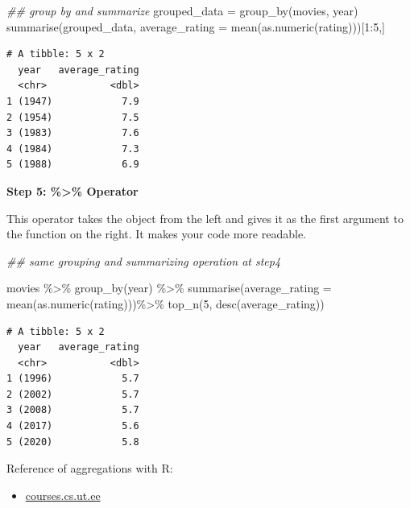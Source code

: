 \documentclass[
  letterpaper,
  DIV=11,
  numbers=noendperiod]{scrreprt}
\newenvironment{Shaded}{\begin{snugshade}}{\end{snugshade}}
\newcommand{\AttributeTok}[1]{\textcolor[rgb]{0.40,0.45,0.13}{#1}}
\newcommand{\DecValTok}[1]{\textcolor[rgb]{0.68,0.00,0.00}{#1}}
\newcommand{\DocumentationTok}[1]{\textcolor[rgb]{0.37,0.37,0.37}{\textit{#1}}}
\newcommand{\FunctionTok}[1]{\textcolor[rgb]{0.28,0.35,0.67}{#1}}
\newcommand{\NormalTok}[1]{\textcolor[rgb]{0.00,0.23,0.31}{#1}}
\newcommand{\OtherTok}[1]{\textcolor[rgb]{0.00,0.23,0.31}{#1}}
\newcommand{\SpecialCharTok}[1]{\textcolor[rgb]{0.37,0.37,0.37}{#1}}
\providecommand{\tightlist}{%
  \setlength{\itemsep}{0pt}\setlength{\parskip}{0pt}}\usepackage{longtable,booktabs,array}
\begin{document}
\begin{Shaded}
\begin{Highlighting}[]
\DocumentationTok{\#\# group by and summarize}
\NormalTok{grouped\_data }\OtherTok{=} \FunctionTok{group\_by}\NormalTok{(movies, year)}
\FunctionTok{summarise}\NormalTok{(grouped\_data, }\AttributeTok{average\_rating =} \FunctionTok{mean}\NormalTok{(}\FunctionTok{as.numeric}\NormalTok{(rating)))[}\DecValTok{1}\SpecialCharTok{:}\DecValTok{5}\NormalTok{,]}
\end{Highlighting}
\end{Shaded}

\begin{verbatim}
# A tibble: 5 x 2
  year   average_rating
  <chr>           <dbl>
1 (1947)            7.9
2 (1954)            7.5
3 (1983)            7.6
4 (1984)            7.3
5 (1988)            6.9
\end{verbatim}

\textbf{Step 5: \%\textgreater\% Operator}

This operator takes the object from the left and gives it as the first
argument to the function on the right. It makes your code more readable.

\begin{Shaded}
\begin{Highlighting}[]
\DocumentationTok{\#\# same grouping and summarizing operation at step4 }

\NormalTok{movies }\SpecialCharTok{\%\textgreater{}\%}
  \FunctionTok{group\_by}\NormalTok{(year) }\SpecialCharTok{\%\textgreater{}\%}
  \FunctionTok{summarise}\NormalTok{(}\AttributeTok{average\_rating =} \FunctionTok{mean}\NormalTok{(}\FunctionTok{as.numeric}\NormalTok{(rating)))}\SpecialCharTok{\%\textgreater{}\%}
  \FunctionTok{top\_n}\NormalTok{(}\DecValTok{5}\NormalTok{, }\FunctionTok{desc}\NormalTok{(average\_rating))}
\end{Highlighting}
\end{Shaded}

\begin{verbatim}
# A tibble: 5 x 2
  year   average_rating
  <chr>           <dbl>
1 (1996)            5.7
2 (2002)            5.7
3 (2008)            5.7
4 (2017)            5.6
5 (2020)            5.8
\end{verbatim}

Reference of aggregations with R:

\begin{itemize}
\tightlist
\item
  \href{https://courses.cs.ut.ee/MTAT.03.183/2017_fall/uploads/Main/dplyr.html}{courses.cs.ut.ee}
\end{itemize}
\end{document}
